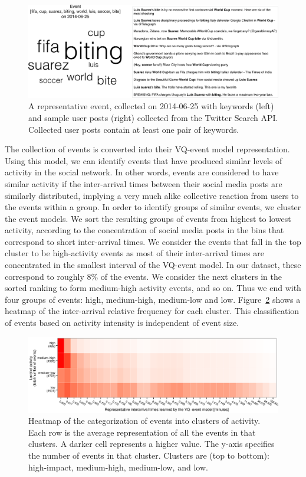 \begin{figure}
  \includegraphics[width=\textwidth]{figures/high-activity/fig2}
  \caption[Example event]{A representative event, collected on 2014-06-25 with
      keywords (left) and sample user posts (right) collected from the Twitter
      Search API. Collected user posts contain at least one pair of keywords. }
  \label{fig:hi:components}
\end{figure}


The collection of events is converted into their VQ-event model representation. 
%
Using this model, we can identify events that have produced similar levels of
activity in the social network. 
%
In other words, events are considered to have similar activity if the
inter-arrival times between their social media posts are similarly distributed,
implying a very much alike collective reaction from users to the events within a
group. 
%
In order to identify groups of similar events, we cluster the event models. 
%
We sort the resulting groups of events from highest to lowest activity,
according to the concentration of social media posts in the bins that correspond
to short inter-arrival times. 
%
We consider the events that fall in the top cluster to be high-activity events
as most of their inter-arrival times are concentrated in the smallest interval of
the VQ-event model.
%
In our dataset, these correspond to roughly 8\% of the events. 
%
We consider the next clusters in the sorted ranking to form medium-high activity
events, and so on. 
%
Thus we end with four groups of events: high, medium-high, medium-low and low.
Figure~\ref{fig:hi:heatmap} shows a heatmap of the inter-arrival relative
frequency for each cluster. 
%
This classification of events based on activity intensity is independent of
event size. 


\begin{figure}
  \includegraphics[width=\textwidth]{figures/high-activity/fig3}
  \caption[Heatmap of the categorization of events into clusters of
  activity.]{{Heatmap of the categorization of events into clusters of activity.
  Each row is the average representation of all the events in that clusters.  A
  darker cell represents a higher value. The y-axis specifies the number of
  events in that cluster. Clusters are (top to bottom): high-impact,
  medium-high, medium-low, and low.}}
  \label{fig:hi:heatmap}
\end{figure}